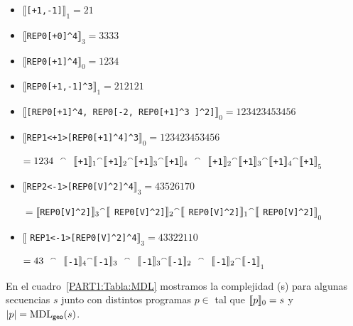 \begin{itemize}
\item  $\llbracket$\verb#[+1,-1]#$\rrbracket_1 = 21$

\item  $\llbracket$\verb#REP0[+0]^4#$\rrbracket_3 = 3333$

\item  $\llbracket$\verb#REP0[+1]^4#$\rrbracket_0 = 1234$

\item  $\llbracket$\verb#REP0[+1,-1]^3#$\rrbracket_1 = 212121$

\item  $\llbracket$\verb#[REP0[+1]^4, REP0[-2, REP0[+1]^3 ]^2]#$\rrbracket_0 = 123423453456$

\item  $\llbracket$\verb#REP1<+1>[REP0[+1]^4]^3#$\rrbracket_0 = 123423453456$

$= 1234 \ \ \concat \ \ \llbracket$\verb#+1#$\rrbracket_1 {}^\smallfrown \llbracket$\verb#+1#$\rrbracket_2 {}^\smallfrown \llbracket$\verb#+1#$\rrbracket_3 {}^\smallfrown \llbracket$\verb#+1#$\rrbracket_4 \ \ \concat \ \ \llbracket$\verb#+1#$\rrbracket_2 {}^\smallfrown \llbracket$\verb#+1#$\rrbracket_3 {}^\smallfrown \llbracket$\verb#+1#$\rrbracket_4 {}^\smallfrown \llbracket$\verb#+1#$\rrbracket_5$

\item  $\llbracket$\verb#REP2<-1>[REP0[V]^2]^4#$\rrbracket_3 = 43526170$ 

$= \llbracket$\verb#REP0[V]^2]#$ \rrbracket_3 {}^\smallfrown \llbracket$ \verb#REP0[V]^2]#$ \rrbracket_2 {}^\smallfrown \llbracket$ \verb#REP0[V]^2]#$ \rrbracket_1 {}^\smallfrown \llbracket$ \verb#REP0[V]^2]#$ \rrbracket_0$

\item  $\llbracket$ \verb#REP1<-1>[REP0[V]^2]^4#$\rrbracket_3 = 43322110$

$= 43 \ \ \concat \ \ \llbracket$\verb#-1#$\rrbracket_4 {}^\smallfrown \llbracket$\verb#-1#$\rrbracket_3 \ \ \concat \ \ \llbracket$\verb#-1#$\rrbracket_3 {}^\smallfrown \llbracket$\verb#-1#$\rrbracket_2 \ \ \concat \ \ \llbracket$\verb#-1#$\rrbracket_2 {}^\smallfrown \llbracket$\verb#-1#$\rrbracket_1 $

\end{itemize}


En el cuadro~\ref{PART1:Tabla:MDL} mostramos la complejidad \mdlgeo(s) para algunas secuencias $s$ junto con distintos programas $p \in$ \gramgeo tal que $\llbracket p\rrbracket_0=s$ y $|p|={\rm MDL}_{{\sf geo}}(s) $.


